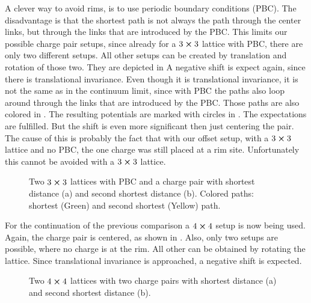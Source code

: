 A clever way to avoid rims, is to use periodic boundary conditions (PBC). The disadvantage is that the shortest path is not always the path through the center links, but through the links that are introduced by the PBC. This limits our possible charge pair setups, since already for a $3 \cross 3$ lattice with PBC, there are only two different setups. All other setups can be created by translation and rotation of those two. They are depicted in 
A negative shift is expect again, since there is translational invariance. Even though it is translational invariance, it is not the same as in the continuum limit, since with PBC the paths also loop around through the links that are introduced by the PBC. Those paths are also colored in .
The resulting potentials are marked with circles in . The expectations are fulfilled. But the shift is even more significant then just centering the pair. The cause of this is probably the fact that with our offset setup, with a $3\cross 3$ lattice and no PBC, the one charge was still placed at a rim site. Unfortunately this cannot be avoided with a $3\cross 3$ lattice.
\begin{figure}[h]
	\begin{center}
		\subfloat[]{
			\scalebox{0.7}{
				
			}
		}
		\subfloat[]{
			\scalebox{0.7}{
				
			}
		}
		\caption{Two $3\cross3$ lattices with PBC and a charge pair with shortest distance (a) and second shortest distance (b). Colored paths: shortest (Green) and second shortest (Yellow) path.} \label{fig:3x3pbcv1}
	\end{center}
\end{figure}

For the continuation of the previous comparison a $4\cross4$ setup is now being used. Again, the charge pair is centered, as shown in . Also, only two setups are possible, where no charge is at the rim. All other can be obtained by rotating the lattice.
Since translational invariance is approached, a negative shift is expected.
\begin{figure}[h]
	\begin{center}
		\subfloat[]{
			\scalebox{0.7}{
				
			}
		}
		\subfloat[]{
			\scalebox{0.7}{
				
			}
		}
		\caption{Two $4\cross 4$ lattices with two charge pairs with shortest distance (a) and second shortest distance (b).}\label{fig:4x4v1}
	\end{center}
\end{figure}


